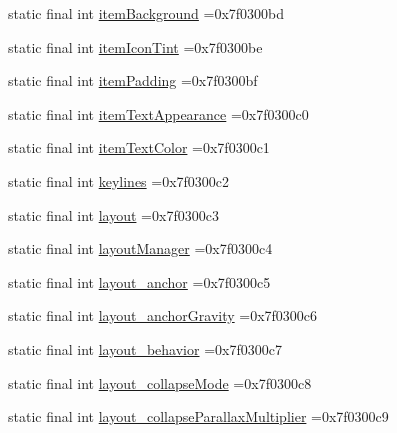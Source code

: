 \begin{DoxyCompactItemize}
\item 
static final int \mbox{\hyperlink{classbr_1_1unb_1_1cic_1_1mp_1_1marketmaster_1_1R_1_1attr_a14f0b3948f7c204e8cb8bf3e5a83b4ca}{item\+Background}} =0x7f0300bd
\item 
static final int \mbox{\hyperlink{classbr_1_1unb_1_1cic_1_1mp_1_1marketmaster_1_1R_1_1attr_ac7718248abe0a7a6cd26d5300839d21f}{item\+Icon\+Tint}} =0x7f0300be
\item 
static final int \mbox{\hyperlink{classbr_1_1unb_1_1cic_1_1mp_1_1marketmaster_1_1R_1_1attr_aeadb3be4ef7ab8cad08bb8012f191c24}{item\+Padding}} =0x7f0300bf
\item 
static final int \mbox{\hyperlink{classbr_1_1unb_1_1cic_1_1mp_1_1marketmaster_1_1R_1_1attr_a9162b72b8494052fd9158c7173094c33}{item\+Text\+Appearance}} =0x7f0300c0
\item 
static final int \mbox{\hyperlink{classbr_1_1unb_1_1cic_1_1mp_1_1marketmaster_1_1R_1_1attr_a5e019861bdd59c877c3657d5c8f95d6f}{item\+Text\+Color}} =0x7f0300c1
\item 
static final int \mbox{\hyperlink{classbr_1_1unb_1_1cic_1_1mp_1_1marketmaster_1_1R_1_1attr_a0c6b16d9b79f7c7ff855393926b7434f}{keylines}} =0x7f0300c2
\item 
static final int \mbox{\hyperlink{classbr_1_1unb_1_1cic_1_1mp_1_1marketmaster_1_1R_1_1attr_ae9181a278b9de48b952458be03a73a3e}{layout}} =0x7f0300c3
\item 
static final int \mbox{\hyperlink{classbr_1_1unb_1_1cic_1_1mp_1_1marketmaster_1_1R_1_1attr_af1a627424aad121efd74dd1e37bf2419}{layout\+Manager}} =0x7f0300c4
\item 
static final int \mbox{\hyperlink{classbr_1_1unb_1_1cic_1_1mp_1_1marketmaster_1_1R_1_1attr_a545d0850c35908059f49e5aabb2ab936}{layout\+\_\+anchor}} =0x7f0300c5
\item 
static final int \mbox{\hyperlink{classbr_1_1unb_1_1cic_1_1mp_1_1marketmaster_1_1R_1_1attr_a63ff8dc978fe11018d9c48b0757472a5}{layout\+\_\+anchor\+Gravity}} =0x7f0300c6
\item 
static final int \mbox{\hyperlink{classbr_1_1unb_1_1cic_1_1mp_1_1marketmaster_1_1R_1_1attr_a231d012d9f0119896ba4a4a8a4ca632c}{layout\+\_\+behavior}} =0x7f0300c7
\item 
static final int \mbox{\hyperlink{classbr_1_1unb_1_1cic_1_1mp_1_1marketmaster_1_1R_1_1attr_afd3ce184cd35b63ba3724338175bd32f}{layout\+\_\+collapse\+Mode}} =0x7f0300c8
\item 
static final int \mbox{\hyperlink{classbr_1_1unb_1_1cic_1_1mp_1_1marketmaster_1_1R_1_1attr_af9eaa28cd7b328df8ae18f6c5225e436}{layout\+\_\+collapse\+Parallax\+Multiplier}} =0x7f0300c9

\end{DoxyCompactItemize}
